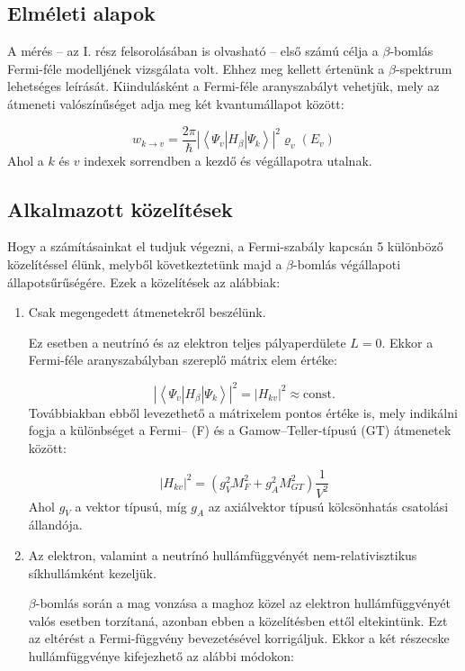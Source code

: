 \begin{multicols}{2}
\section{Elméleti alapok}
A mérés -- az I. rész felsorolásában is olvasható -- első számú célja a $\beta$-bomlás Fermi-féle modelljének vizsgálata volt. Ehhez meg kellett értenünk a $\beta$-spektrum lehetséges leírását. Kiindulásként a Fermi-féle aranyszabályt vehetjük, mely az átmeneti valószínűséget adja meg két kvantumállapot között:

\begin{equation}
w_{k \to v}
=
\frac{2 \pi}{\hbar} \left| \left< \Psi_{v} \left| H_{\beta} \right| \Psi_{k} \right> \right|^{2} \varrho_{v} \left( E_{v} \right)
\end{equation}
Ahol a $k$ és $v$ indexek sorrendben a kezdő és végállapotra utalnak.

\subsection{Alkalmazott közelítések}
Hogy a számításainkat el tudjuk végezni, a Fermi-szabály kapcsán 5 különböző közelítéssel élünk, melyből következtetünk majd a $\beta$-bomlás végállapoti állapotsűrűségére. Ezek a közelítések az alábbiak:

\begin{enumerate}
\item Csak megengedett átmenetekről beszélünk. \par
Ez esetben a neutrínó és az elektron teljes pályaperdülete $L = 0$. Ekkor a Fermi-féle aranyszabályban szereplő mátrix elem értéke:

\begin{equation}
\left| \left< \Psi_{v} \left| H_{\beta} \right| \Psi_{k} \right> \right|^{2}
=
\left| H_{kv} \right|^{2}
\approx
\text{const.}
\end{equation}
Továbbiakban ebből levezethető a mátrixelem pontos értéke is, mely indikálni fogja a különbséget a Fermi-- (F) és a Gamow--Teller-típusú (GT) átmenetek között:

\begin{equation}
\left| H_{kv} \right|^{2}
=
\left( g_{V}^{2} M_{F}^{2} + g_{A}^{2} M_{GT}^{2} \right) \frac{1}{V^{2}}
\end{equation}
Ahol $g_{V}$ a vektor típusú, míg $g_{A}$ az axiálvektor típusú kölcsönhatás csatolási állandója.

\item Az elektron, valamint a neutrínó hullámfüggvényét nem-relativisztikus síkhullámként kezeljük. \par
$\beta$-bomlás során a mag vonzása a maghoz közel az elektron hullámfüggvényét valós esetben torzítaná, azonban ebben a közelítésben ettől eltekintünk. Ezt az eltérést a Fermi-függvény bevezetésével korrigáljuk. Ekkor a két részecske hullámfüggvénye kifejezhető az alábbi módokon:


\end{enumerate}
\end{multicols}
